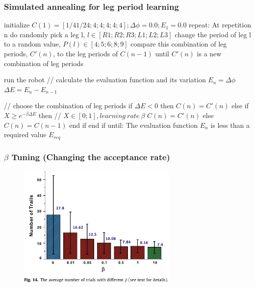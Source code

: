 \documentclass{beamer}
\begin{document}
\begin{frame}[fragile]
\frametitle{Simulated annealing for leg period learning}
\begin{algorithm}[mathescape]
initialize $C(1)= [1/4 1/24; 4; 4; 4; 4; 4]; \Delta\phi= 0.0; E_1 = 0.0$
repeat:
    At repetition n
    do
        randomly pick a leg l, $l \in [R1; R2; R3; L1; L2; L3]$
        change the period of leg l to a random value, $P(l) \in [4; 5; 6; 8; 9]$
        compare this combination of leg periods, $C'(n)$, to the leg periods of $C(n-1)$
    until $C'(n)$ is a new combination of leg periods
    
    run the robot
    // calculate the evaluation function and its variation
    $E_n = \Delta\phi$
    $\Delta E = E_n - E_{n-1}$
    
    // choose the combination of leg periods
    if $\Delta E < 0$ then
        $C(n) = C'(n)$
    else
        if  $X \geq e^{-\beta \Delta E}$ then // $X \in [0;1], learning~rate~\beta$ 
            $C(n) = C'(n)$
        else
            $C(n) = C(n - 1)$
        end if
    end if
until: The evaluation function $E_n$ is less than a required value $E_{req}$
\end{algorithm}
\end{frame}

\begin{frame}
\frametitle{$\beta$ Tuning (Changing the acceptance rate)}
\begin{figure}
\center
\includegraphics[width=0.7\textwidth]{figs/beta-tuning.pdf}
\end{figure}
\end{frame}
\end{document}

